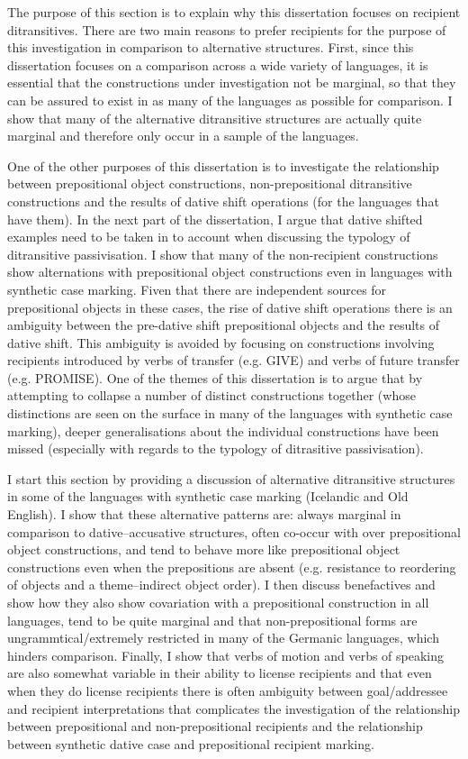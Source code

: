 \documentclass[11pt]{upenndiss}
\begin{document}
The purpose of this section is to explain why this dissertation focuses on recipient ditransitives. There are two main reasons to prefer recipients for the purpose of this investigation in comparison to alternative structures. First, since this dissertation focuses on a comparison across a wide variety of languages, it is essential that the constructions under investigation not be marginal, so that they can be assured to exist in as many of the languages as possible for comparison. I show that many of the alternative ditransitive structures are actually quite marginal and therefore only occur in a sample of the languages. 

One of the other purposes of this dissertation is to investigate the relationship between prepositional object constructions, non-prepositional ditransitive constructions and the results of dative shift operations (for the languages that have them). In the next part of the dissertation, I argue that dative shifted examples need to be taken in to account when discussing the typology of ditransitive passivisation. I show that many of the non-recipient constructions show alternations with prepositional object constructions even in languages with synthetic case marking. Fiven that there are independent sources for prepositional objects in these cases, the rise of dative shift operations there is an ambiguity between the pre-dative shift prepositional objects and the results of dative shift. This ambiguity is avoided by focusing on constructions involving recipients introduced by verbs of transfer (e.g. GIVE) and verbs of future transfer (e.g. PROMISE). One of the themes of this dissertation is to argue that by attempting to collapse a number of distinct constructions together (whose distinctions are seen on the surface in many of the languages with synthetic case marking), deeper generalisations about the individual constructions have been missed (especially with regards to the typology of ditrasitive passivisation).

I start this section by providing a discussion of alternative ditransitive structures in some of the languages with synthetic case marking (Icelandic and Old English). I show that these alternative patterns are: always marginal in comparison to dative--accusative structures, often co-occur with over prepositional object constructions, and tend to behave more like prepositional object constructions even when the prepositions are absent (e.g. resistance to reordering of objects and a theme--indirect object order). I then discuss benefactives and show how they also show covariation with a prepositional construction in all languages, tend to be quite marginal and that non-prepositional forms are ungrammtical/extremely restricted in many of the Germanic languages, which hinders comparison. Finally, I show that verbs of motion and verbs of speaking are also somewhat variable in their ability to license recipients and that even when they do license recipients there is often ambiguity between goal/addressee and recipient interpretations that complicates the investigation of the relationship between prepositional and non-prepositional recipients and the relationship between synthetic dative case and prepositional recipient marking.
\end{document}
